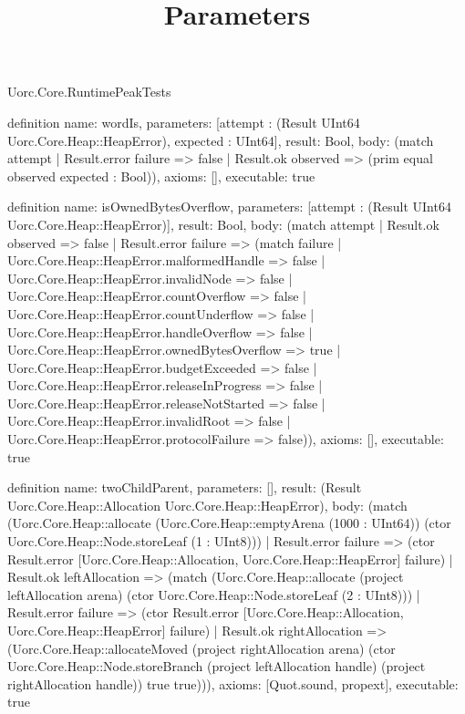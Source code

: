 \begin{lexlean}{Uorc.Core.RuntimePeakTests}





\title{Parameters}

\begin{semanticmodule}
definition{
  name: wordIs,
  parameters: [attempt : (Result UInt64 Uorc.Core.Heap::HeapError), expected : UInt64],
  result: Bool,
  body: (match attempt
    | Result.error failure => false
    | Result.ok observed => (prim equal observed expected : Bool)),
  axioms: [],
  executable: true
}

definition{
  name: isOwnedBytesOverflow,
  parameters: [attempt : (Result UInt64 Uorc.Core.Heap::HeapError)],
  result: Bool,
  body: (match attempt
    | Result.ok observed => false
    | Result.error failure => (match failure
      | Uorc.Core.Heap::HeapError.malformedHandle => false
      | Uorc.Core.Heap::HeapError.invalidNode => false
      | Uorc.Core.Heap::HeapError.countOverflow => false
      | Uorc.Core.Heap::HeapError.countUnderflow => false
      | Uorc.Core.Heap::HeapError.handleOverflow => false
      | Uorc.Core.Heap::HeapError.ownedBytesOverflow => true
      | Uorc.Core.Heap::HeapError.budgetExceeded => false
      | Uorc.Core.Heap::HeapError.releaseInProgress => false
      | Uorc.Core.Heap::HeapError.releaseNotStarted => false
      | Uorc.Core.Heap::HeapError.invalidRoot => false
      | Uorc.Core.Heap::HeapError.protocolFailure => false)),
  axioms: [],
  executable: true
}

definition{
  name: twoChildParent,
  parameters: [],
  result: (Result Uorc.Core.Heap::Allocation Uorc.Core.Heap::HeapError),
  body: (match (Uorc.Core.Heap::allocate (Uorc.Core.Heap::emptyArena (1000 : UInt64)) (ctor Uorc.Core.Heap::Node.storeLeaf (1 : UInt8)))
    | Result.error failure => (ctor Result.error [Uorc.Core.Heap::Allocation, Uorc.Core.Heap::HeapError] failure)
    | Result.ok leftAllocation => (match (Uorc.Core.Heap::allocate (project leftAllocation arena) (ctor Uorc.Core.Heap::Node.storeLeaf (2 : UInt8)))
      | Result.error failure => (ctor Result.error [Uorc.Core.Heap::Allocation, Uorc.Core.Heap::HeapError] failure)
      | Result.ok rightAllocation => (Uorc.Core.Heap::allocateMoved (project rightAllocation arena) (ctor Uorc.Core.Heap::Node.storeBranch (project leftAllocation handle) (project rightAllocation handle)) true true))),
  axioms: [Quot.sound, propext],
  executable: true
}


\end{semanticmodule}
\end{lexlean}

